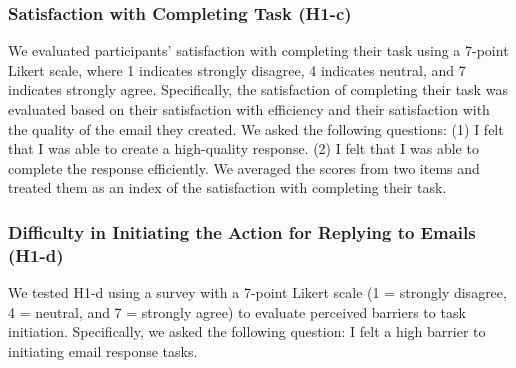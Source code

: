 \subsubsection{}


\subsubsection{Satisfaction with Completing Task (H1-c)}
We evaluated participants' satisfaction with completing their task using a 7-point Likert scale, where 1 indicates strongly disagree, 4 indicates neutral, and 7 indicates strongly agree.
Specifically, the satisfaction of completing their task was evaluated based on their satisfaction with efficiency and their satisfaction with the quality of the email they created.
We asked the following questions: 
(1) I felt that I was able to create a high-quality response. 
(2) I felt that I was able to complete the response efficiently.
We averaged the scores from two items and treated them as an index of the satisfaction with completing their task.


\subsubsection{Difficulty in Initiating the Action for Replying to Emails (H1-d)}
We tested H1-d using a survey with a 7-point Likert scale (1 = strongly disagree, 4 = neutral, and 7 = strongly agree) to evaluate perceived barriers to task initiation. 
Specifically, we asked the following question: I felt a high barrier to initiating email response tasks.

